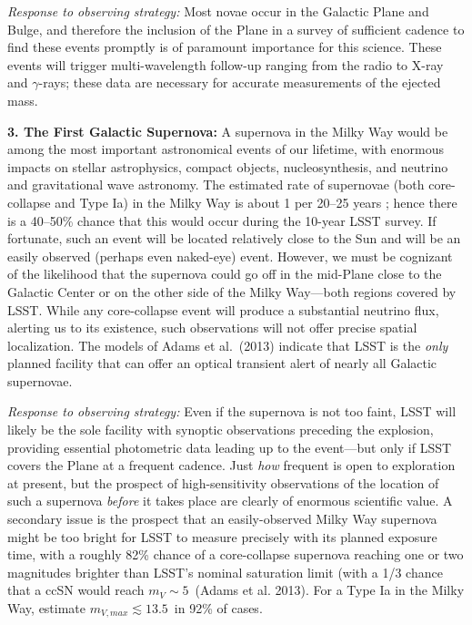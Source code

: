 {\it Response to observing strategy:} Most novae occur in the Galactic
Plane and Bulge, and therefore the inclusion of the Plane in a survey
of sufficient cadence to find these events promptly is of paramount
importance for this science. These events will trigger
multi-wavelength follow-up ranging from the radio to X-ray and
$\gamma$-rays; these data are necessary for accurate measurements of
the ejected mass.

{\bf 3. The First Galactic Supernova:} A supernova in the Milky Way
would be among the most important astronomical events of our lifetime,
with enormous impacts on stellar astrophysics, compact objects,
nucleosynthesis, and neutrino and gravitational wave astronomy. The
estimated rate of supernovae (both core-collapse and Type Ia) in the
Milky Way is about 1 per 20--25 years \citep{2013ApJ...778..164A}; hence there
is a 40--50\% chance that this would occur during the 10-year LSST
survey. If fortunate, such an event will be located relatively close
to the Sun and will be an easily observed (perhaps even naked-eye)
event. However, we must be cognizant of the likelihood that the
supernova could go off in the mid-Plane close to the Galactic Center
or on the other side of the Milky Way---both regions covered by
LSST. While any core-collapse event will produce a substantial
neutrino flux, alerting us to its existence, such observations will
not offer precise spatial localization. The models of Adams et
al.~(2013) indicate that LSST is the \emph{only} planned facility that
can offer an optical transient alert of nearly all Galactic
supernovae. 

{\it Response to observing strategy:} Even if the supernova is not too
faint, LSST will likely be the sole facility with synoptic
observations preceding the explosion, providing essential photometric
data leading up to the event---but only if LSST covers the Plane at a
frequent cadence. Just {\it how} frequent is open to exploration at
present, but the prospect of high-sensitivity observations of the
location of such a supernova {\it before} it takes place are clearly
of enormous scientific value. A secondary issue is the prospect that
an easily-observed Milky Way supernova might be too bright for LSST to
measure precisely with its planned exposure time, with a roughly 82\%
chance of a core-collapse supernova reaching one or two magnitudes
brighter than LSST's nominal saturation limit (with a 1/3 chance that
a ccSN would reach $m_V \sim 5$~(Adams et al. 2013). For a Type Ia in
the Milky Way, 
\citet{2013ApJ...778..164A} estimate $m_{V, max} \lesssim 13.5$~in 92\% of
cases.

